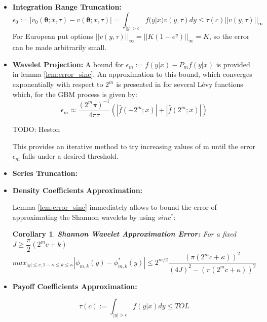 \documentclass[12,twoside]{mammeTFM}
\newtheorem{cor}[thm]{Corollary}
\theoremstyle{definition}
\theoremstyle{remark}
\begin{document}
\begin{itemize}
\item \textbf{Integration Range Truncation: }
\begin{equation}
\epsilon_{0} := 
\left| v_0(\boldsymbol{\theta}; x, \tau) - v(\boldsymbol{\theta}; x, \tau) \right| = 
\int_{|y| > c} 
f(y|x) v(y, \tau) 
dy \leq \tau(c) ||v(y, \tau)||_{\infty}
\end{equation}
For European put options $ ||v(y, \tau)||_{\infty} = ||K (1 - e^y)||_{\infty} = K $, so the error can be made arbitrarily small.
\item \textbf{Wavelet Projection:}
A bound for $\epsilon_m := f(y|x) - P_mf(y|x)$ is provided in lemma \ref{lem:error_sinc}. An approximation to this bound, which converges exponentially with respect to $2^m$ is presented in \cite{mar17} for several L\'evy functions which, for the GBM process is given by:
\begin{equation}
\epsilon_m \approx \dfrac{(2^m \pi)^{-1}}{4 \pi \tau}\left( \left| \hat{f}(-2^m;x) \right| + \left| \hat{f}(2^m;x)\right| \right)
\end{equation}

TODO: Heston

This provides an iterative method to try increasing values of m until the error $\epsilon_m$ falls under a desired threshold.

\item \textbf{Series Truncation: }



\item \textbf{Density Coefficients Approximation: }

Lemma \ref{lem:error_sinc} immediately allows to bound the error of approximating the Shannon wavelets by using $sinc^{*}$:
\begin{cor} \label{cor:error_shannon_wavelets} \textbf{Shannon Wavelet Approximation Error:}
For a fixed $J \geq \dfrac{\pi}{2}(2^m c + k)$
\begin{equation}
max_{|y| \leq c, 1 - \kappa \leq k \leq \kappa} \left| \phi_{m,k}(y) - \phi^{*}_{m,k}(y) \right| \leq 2^{m/2}\dfrac{(\pi(2^m c + \kappa))^2}{(4J)^2 - (\pi(2^m c + \kappa))^2}
\end{equation}
\end{cor}
\item \textbf{Payoff Coefficients Approximation: }

\begin{equation}
\tau(c):= \int_{|y| > c} f(y|x) dy \leq TOL
\end{equation}

\end{itemize}
\end{document}
